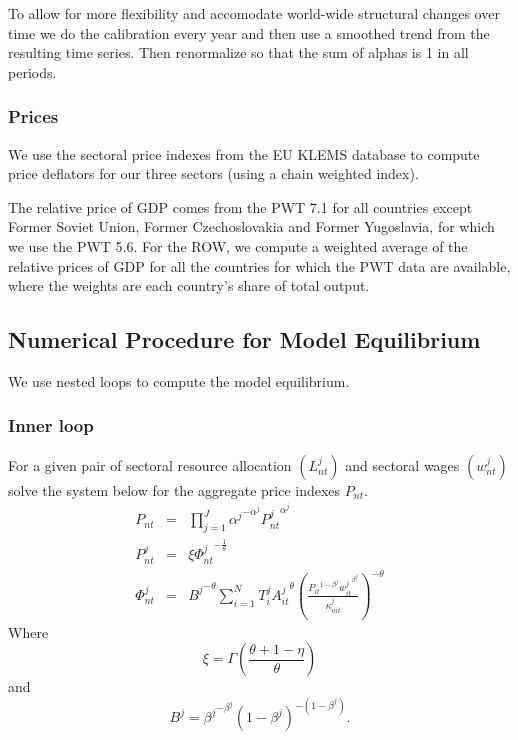 \documentclass[12pt]{article}
\begin{document}
To allow for more flexibility and accomodate world-wide structural changes
over time we do the calibration every year and then use a smoothed trend
from the resulting time series. Then renormalize so that the sum of alphas
is 1 in all periods.

\subsubsection{Prices}

We use the sectoral price indexes from the EU KLEMS database to compute
price deflators for our three sectors (using a chain weighted index).

The relative price of GDP comes from the PWT 7.1 for all countries except
Former Soviet Union, Former Czechoslovakia and Former Yugoslavia, for which
we use the PWT 5.6. For the ROW, we compute a weighted average of the
relative prices of GDP for all the countries for which the PWT data are
available, where the weights are each country's share of total output.

\subsection{Numerical Procedure for Model Equilibrium}

We use nested loops to compute the model equilibrium.

\subsubsection{Inner loop}

For a given pair of sectoral resource allocation $(L_{nt}^j)$ and sectoral
wages $(w_{nt}^j)$ solve the system below for the aggregate price indexes $%
P_{nt}.$ 
\begin{eqnarray}
P_{nt} &=& \prod_{j = 1}^J {\alpha^j}^{- \alpha^j} {P_{nt}^j}^{\alpha^j}
\label{aggr1} \\
P_{nt}^j &=& \xi {\Phi_{nt}^j}^{-\frac{1}{\theta}}  \label{aggr2} \\
\Phi_{nt}^j &=& {B^j}^{-\theta} \sum_{i = 1}^N T_i^j {A_{it}^j}^{\theta}
\left(\frac{{P_{it}}^{1 - \beta^j} {w_{it}^j}^{\beta^j}}{\kappa_{nit}^j}%
\right)^{-\theta}
\end{eqnarray}
Where 
\begin{equation*}
\xi = \Gamma\left(\frac{\theta + 1 - \eta}{\theta}\right)
\end{equation*}
and 
\begin{equation*}
B^j = {\beta^j}^{- \beta^j} (1 - \beta^j)^{-(1 - \beta^j)}.
\end{equation*}
\end{document}

